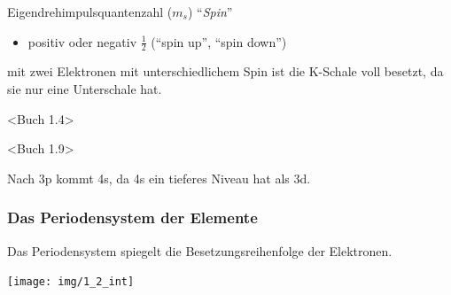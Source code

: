 Eigendrehimpulsquantenzahl ($m_s$) ``\textit{Spin}''
\begin{itemize}
	\item positiv oder negativ $\frac{1}{2}$ (``spin up'', ``spin down'')
\end{itemize}
\Ra mit zwei Elektronen mit unterschiedlichem Spin ist die K-Schale voll besetzt, da sie nur eine Unterschale hat.

<Buch 1.4>

<Buch 1.9>

Nach 3p kommt 4s, da 4s ein tieferes Niveau hat als 3d.

\subsubsection{Das Periodensystem der Elemente}

Das Periodensystem spiegelt die Besetzungsreihenfolge der Elektronen.

\begin{center}
	\texttt{[image: img/1\_2\_int]}
\end{center}
